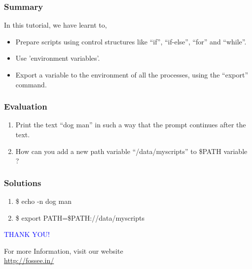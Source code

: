 \documentclass[12pt,compress]{beamer}
\begin{document}
\begin{frame}
\frametitle{Summary}
\label{sec-8}

  In this tutorial, we have learnt to,


\begin{itemize}
\item Prepare scripts using control structures like ``if'', ``if-else'',
      ``for'' and ``while''.
\item Use 'environment variables'.
\item Export a variable to the environment of all the processes, using 
      the ``export'' command.
\end{itemize}
\end{frame}
\begin{frame}[fragile]
\frametitle{Evaluation}
\label{sec-9}


\begin{enumerate}
\item Print the text ``dog man'' in such a way that the prompt 
    continues after the text.
\vspace{8pt}
\item How can you add a new path variable ``/data/myscripts'' to \$PATH variable ?
\end{enumerate}
\end{frame}
\begin{frame}
\frametitle{Solutions}
\label{sec-10}


\begin{enumerate}
\item \$ echo -n dog man
\vspace{15pt}
\item \$ export PATH=\$PATH://data/myscripts
\end{enumerate}
\end{frame}
\begin{frame}

  \begin{block}{}
  \begin{center}
  \textcolor{blue}{\Large THANK YOU!} 
  \end{center}
  \end{block}
\begin{block}{}
  \begin{center}
    For more Information, visit our website\\
    \url{http://fossee.in/}
  \end{center}  
  \end{block}
\end{frame}
\end{document}
